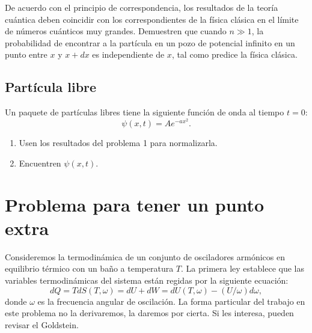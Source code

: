 \documentclass[10pt,letterpaper]{article}
\newenvironment{modenumerate}
  {\enumerate\setupmodenumerate}
  {\endenumerate}
\newif\ifmoditem
\newcommand{\setupmodenumerate}{%
  \global\moditemfalse
  \let\origmakelabel\makelabel
  \def\moditem##1{\global\moditemtrue\def\mesymbol{##1}\item}%
  \def\makelabel##1{%
    \origmakelabel{##1\ifmoditem\rlap{\mesymbol}\fi\enspace}%
    \global\moditemfalse}%
}
\begin{document}
\begin{modenumerate}
\moditem{} De acuerdo con el principio de correspondencia, los resultados de la teoría cuántica deben coincidir con los correspondientes de la física clásica en el límite de números cuánticos muy grandes. Demuestren que cuando $n \gg 1$, la probabilidad de encontrar a la partícula en un pozo de potencial infinito en un punto entre $x$ y $x+dx$ es independiente de $x$, tal como predice la física clásica.
\subsection{Partícula libre}
\moditem{} Un paquete de partículas libres tiene la siguiente función de onda al tiempo $t=0$:
\begin{equation}
\psi(x,t) = Ae^{-ax^2}.
\end{equation}
\begin{enumerate}
\item Usen los resultados del problema 1 para normalizarla.
\item Encuentren $\psi(x,t)$.
\end{enumerate}


\section{Problema para tener un punto extra}

\moditem{} Consideremos la termodinámica de un conjunto de osciladores armónicos en equilibrio térmico con un baño a temperatura $T$. La primera ley establece que las variables termodinámicas del sistema están regidas por la siguiente ecuación:
\begin{equation}
dQ=TdS(T,\omega)=dU+dW=dU(T,\omega)-(U/\omega)d\omega ,
\end{equation}
donde $\omega$ es la frecuencia angular de oscilación. La forma particular del trabajo en este problema no la derivaremos, la daremos por cierta. Si les interesa, pueden revisar el Goldstein.


\end{modenumerate}
\end{document}
